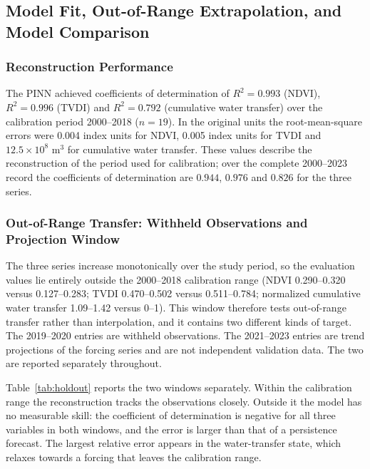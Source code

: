 \documentclass[preprint,review,12pt,3p]{elsarticle}
\begin{document}
\subsection{Model Fit, Out-of-Range Extrapolation, and Model Comparison}
\label{subsec:validation}

\subsubsection{Reconstruction Performance}

The PINN achieved coefficients of determination of $R^2=0.993$ (NDVI), $R^2=0.996$ (TVDI) and $R^2=0.792$ (cumulative water transfer) over the calibration period 2000--2018 ($n=19$). In the original units the root-mean-square errors were 0.004 index units for NDVI, 0.005 index units for TVDI and $12.5\times10^{8}$ m$^{3}$ for cumulative water transfer. These values describe the reconstruction of the period used for calibration; over the complete 2000--2023 record the coefficients of determination are $0.944$, $0.976$ and $0.826$ for the three series.

\subsubsection{Out-of-Range Transfer: Withheld Observations and Projection Window}

The three series increase monotonically over the study period, so the evaluation values lie entirely outside the 2000--2018 calibration range (NDVI 0.290--0.320 versus 0.127--0.283; TVDI 0.470--0.502 versus 0.511--0.784; normalized cumulative water transfer 1.09--1.42 versus 0--1). This window therefore tests out-of-range transfer rather than interpolation, and it contains two different kinds of target. The 2019--2020 entries are withheld observations. The 2021--2023 entries are trend projections of the forcing series and are not independent validation data. The two are reported separately throughout.

Table~\ref{tab:holdout} reports the two windows separately. Within the calibration range the reconstruction tracks the observations closely. Outside it the model has no measurable skill: the coefficient of determination is negative for all three variables in both windows, and the error is larger than that of a persistence forecast. The largest relative error appears in the water-transfer state, which relaxes towards a forcing that leaves the calibration range.
\end{document}
